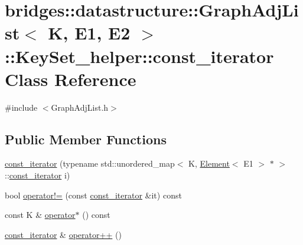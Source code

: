 \hypertarget{classbridges_1_1datastructure_1_1_graph_adj_list_1_1_key_set__helper_1_1const__iterator}{}\section{bridges\+:\+:datastructure\+:\+:Graph\+Adj\+List$<$ K, E1, E2 $>$\+:\+:Key\+Set\+\_\+helper\+:\+:const\+\_\+iterator Class Reference}
\label{classbridges_1_1datastructure_1_1_graph_adj_list_1_1_key_set__helper_1_1const__iterator}


{\ttfamily \#include $<$Graph\+Adj\+List.\+h$>$}

\subsection*{Public Member Functions}
\begin{DoxyCompactItemize}
\item 
\mbox{\hyperlink{classbridges_1_1datastructure_1_1_graph_adj_list_1_1_key_set__helper_1_1const__iterator_a028172e70957f093f02ee95c77d89392}{const\+\_\+iterator}} (typename std\+::unordered\+\_\+map$<$ K, \mbox{\hyperlink{classbridges_1_1datastructure_1_1_element}{Element}}$<$ E1 $>$ $\ast$ $>$\+::\mbox{\hyperlink{classbridges_1_1datastructure_1_1_graph_adj_list_1_1_key_set__helper_1_1const__iterator}{const\+\_\+iterator}} i)
\item 
bool \mbox{\hyperlink{classbridges_1_1datastructure_1_1_graph_adj_list_1_1_key_set__helper_1_1const__iterator_a373e0c206d63dfda41108ebfcfae5fe8}{operator!=}} (const \mbox{\hyperlink{classbridges_1_1datastructure_1_1_graph_adj_list_1_1_key_set__helper_1_1const__iterator}{const\+\_\+iterator}} \&it) const
\item 
const K \& \mbox{\hyperlink{classbridges_1_1datastructure_1_1_graph_adj_list_1_1_key_set__helper_1_1const__iterator_a8369373435ffc6d6bfb3d5d5da13eea3}{operator$\ast$}} () const
\item 
\mbox{\hyperlink{classbridges_1_1datastructure_1_1_graph_adj_list_1_1_key_set__helper_1_1const__iterator}{const\+\_\+iterator}} \& \mbox{\hyperlink{classbridges_1_1datastructure_1_1_graph_adj_list_1_1_key_set__helper_1_1const__iterator_acbeb342b54bfdb8ece520e9d5cbf66db}{operator++}} ()
\end{DoxyCompactItemize}


